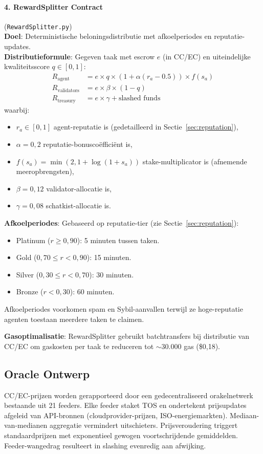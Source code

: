 \documentclass[11pt]{article}
\begin{document}
\paragraph{4. RewardSplitter Contract} (\texttt{RewardSplitter.py})\\
\textbf{Doel}: Deterministische beloningsdistributie met afkoelperiodes en reputatie-updates.\\
\textbf{Distributieformule}: Gegeven taak met escrow $e$ (in CC/EC) en uiteindelijke kwaliteitsscore $q \in [0,1]$:
\begin{align}
R_{\text{agent}} &= e \times q \times \left(1 + \alpha (r_a - 0.5)\right) \times f(s_a) \label{eq:reward-agent} \\
R_{\text{validators}} &= e \times \beta \times (1-q) \label{eq:reward-validators} \\
R_{\text{treasury}} &= e \times \gamma + \text{slashed funds} \label{eq:reward-treasury}
\end{align}
waarbij:
\begin{itemize}[noitemsep]
  \item $r_a \in [0,1]$ agent-reputatie is (gedetailleerd in Sectie~\ref{sec:reputation}),
  \item $\alpha = 0,2$ reputatie-bonuscoëfficiënt is,
  \item $f(s_a) = \min(2, 1 + \log(1+s_a))$ stake-multiplicator is (afnemende meeropbrengsten),
  \item $\beta = 0,12$ validator-allocatie is,
  \item $\gamma = 0,08$ schatkist-allocatie is.
\end{itemize}
\textbf{Afkoelperiodes}: Gebaseerd op reputatie-tier (zie Sectie~\ref{sec:reputation}):
\begin{itemize}[noitemsep]
  \item Platinum ($r \geq 0,90$): 5 minuten tussen taken.
  \item Gold ($0,70 \leq r < 0,90$): 15 minuten.
  \item Silver ($0,30 \leq r < 0,70$): 30 minuten.
  \item Bronze ($r < 0,30$): 60 minuten.
\end{itemize}
Afkoelperiodes voorkomen spam en Sybil-aanvallen terwijl ze hoge-reputatie agenten toestaan meerdere taken te claimen.

\textbf{Gasoptimalisatie}: RewardSplitter gebruikt batchtransfers bij distributie van CC/EC om gaskosten per taak te reduceren tot $\sim$30.000 gas (\$0,18).

\subsection{Oracle Ontwerp}
CC/EC-prijzen worden gerapporteerd door een gedecentraliseerd orakelnetwerk bestaande uit 21 feeders. Elke feeder staket TOS en ondertekent prijsupdates afgeleid van API-bronnen (cloudprovider-prijzen, ISO-energiemarkten). Mediaan-van-medianen aggregatie vermindert uitschieters. Prijsveroudering triggert standaardprijzen met exponentieel gewogen voortschrijdende gemiddelden. Feeder-wangedrag resulteert in slashing evenredig aan afwijking.
\end{document}
